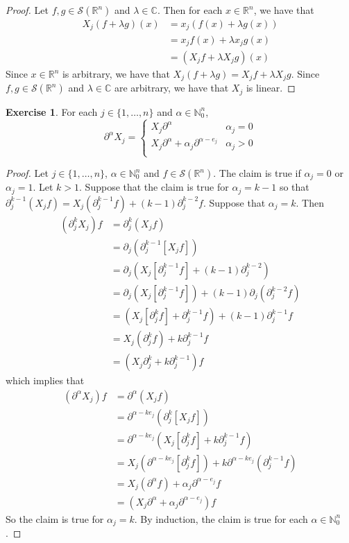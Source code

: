 \documentclass{book}
\theoremstyle{definition}
\newtheorem{ex}[definition]{Exercise}
\newcommand{\al}{\alpha}
\newcommand{\lam}{\lambda}
\newcommand{\C}{\mathbb{C}}
\newcommand{\N}{\mathbb{N}}
\newcommand{\R}{\mathbb{R}}
\newcommand{\MS}{\mathcal{S}}
\DeclareMathOperator*{\0}{\mbf{0}}
\DeclareMathOperator*{\1}{\mbf{1}}
\newcommand{\p}{\partial}
\begin{document}
	\begin{proof}
		Let $f, g \in \MS(\R^n)$ and $\lam \in \C$. Then for each $x \in \R^n$, we have that
		\begin{align*}
			X_j(f + \lam g)(x) 
			& = x_j(f(x) + \lam g(x)) \\
			& = x_jf(x) + \lam x_j g(x) \\
			& = (X_jf + \lam X_jg)(x)
		\end{align*} 
		Since $x \in \R^n$ is arbitrary, we have that $X_j(f + \lam g) = X_jf + \lam X_jg$. Since $f, g \in \MS(\R^n)$ and $\lam \in \C$ are arbitrary, we have that $X_j$ is linear.
	\end{proof}

	\begin{ex}
		For each $j \in \{1, \ldots, n\}$ and $\al \in \N_0^n$, 
		\[
		\p^{\al}X_j = 
		\begin{cases}
			X_j \p^{\al} & \al_j = 0 \\
			X_j \p^{\al}  + \al_j \p^{\al - e_j}  & \al_j > 0 \\
		\end{cases}
		\]
	\end{ex}
	
	\begin{proof}
		Let $j \in \{1, \ldots, n\}$, $\al \in \N_0^n$ and $f \in \MS(\R^n)$. The claim is true if $\al_j = 0$ or $\al _j = 1$.  Let $k > 1$. Suppose that the claim is true for $\al_j = k - 1$ so that $\p_j^{k-1}(X_jf)= X_j(\p_j^{k-1}f) + (k - 1) \p_j^{k-2} f$. Suppose that $\al_j = k$. Then 
		\begin{align*}
			(\p_j^k X_j) f
			& = \p_j^k (X_j f) \\
			&= \p_j (\p_j^{k-1} [X_jf]) \\
			&= \p_j (X_j[\p_j^{k-1}f] + (k - 1) \p_j^{k-2}) \\
			&= \p_j (X_j[\p_j^{k-1}f]) + (k - 1) \p_j( \p_j^{k-2} f) \\
			&= (X_j [\p_j^{k}f] + \p_j^{k-1}f)  + (k -1) \p_j^{k-1}f \\
			&= X_j (\p_j^{k}f) + k \p_j^{k-1}f \\
			& = (X_j \p_j^{k} + k \p_j^{k-1}) f
		\end{align*}
		which implies that  
		\begin{align*}
			(\p^{\al} X_j) f
			& = \p^{\al}(X_j f) \\ 
			& = \p^{\al - k e_j} (\p_j^{k} [X_j f]) \\
			& = \p^{\al - k e_j} (X_j [\p_j^{k}f] + k \p_j^{k-1}f) \\
			& = X_j (\p^{\al - k e_j}[\p_j^k f]) +  k \p^{\al - k e_j} (\p_j^{k-1}f) \\
			& = X_j(\p^{\al} f) + \al_j \p^{\al - e_j} f \\
			& = (X_j \p^{\al}  + \al_j \p^{\al - e_j} )f
		\end{align*}
		So the claim is true for $\al_j = k$. By induction, the claim is true for each $\al \in \N_0^n$. 
	\end{proof}
	
\end{document}
